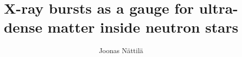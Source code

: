 \begin{titlepage} 

    \title{\titlefont X-ray bursts as a gauge for ultra-dense matter inside neutron stars}
    
    \author{Joonas Nättilä}
    \date{}
    \maketitle


\end{titlepage}
